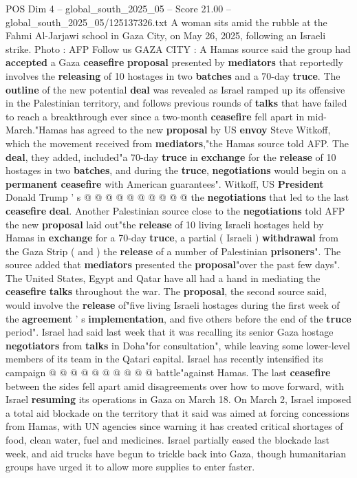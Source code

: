 \begin{textsample}{POS Dim 4 – global\_south\_2025\_05 – Score 21.00 – global\_south\_2025\_05/125137326.txt}  \label{ex:f4_pos_096}
A woman sits amid the rubble at the Fahmi Al-Jarjawi school in Gaza City, on May 26, 2025, following an Israeli strike.
Photo : AFP Follow us GAZA CITY : A Hamas source said the group had \textbf{accepted} a Gaza \textbf{ceasefire} \textbf{proposal} presented by \textbf{mediators} that reportedly involves the \textbf{releasing} of 10 hostages in two \textbf{batches} and a 70-day \textbf{truce}.
The \textbf{outline} of the new potential \textbf{deal} was revealed as Israel ramped up its offensive in the Palestinian territory, and follows previous rounds of \textbf{talks} that have failed to reach a breakthrough ever since a two-month \textbf{ceasefire} fell apart in mid-March."Hamas has agreed to the new \textbf{proposal} by US \textbf{envoy} Steve Witkoff, which the movement received from \textbf{mediators},"the Hamas source told AFP.
The \textbf{deal}, they added, included"a 70-day \textbf{truce} in \textbf{exchange} for the \textbf{release} of 10 hostages in two \textbf{batches}, and during the \textbf{truce}, \textbf{negotiations} would begin on a \textbf{permanent} \textbf{ceasefire} with American guarantees".
Witkoff, US \textbf{President} Donald Trump ' s @ @ @ @ @ @ @ @ @ @ the \textbf{negotiations} that led to the last \textbf{ceasefire} \textbf{deal}.
Another Palestinian source close to the \textbf{negotiations} told AFP the new \textbf{proposal} laid out"the \textbf{release} of 10 living Israeli hostages held by Hamas in \textbf{exchange} for a 70-day \textbf{truce}, a partial ( Israeli ) \textbf{withdrawal} from the Gaza Strip ( and ) the \textbf{release} of a number of Palestinian \textbf{prisoners}".
The source added that \textbf{mediators} presented the \textbf{proposal}"over the past few days".
The United States, Egypt and Qatar have all had a hand in mediating the \textbf{ceasefire} \textbf{talks} throughout the war.
The \textbf{proposal}, the second source said, would involve the \textbf{release} of"five living Israeli hostages during the first week of the \textbf{agreement} ' s \textbf{implementation}, and five others before the end of the \textbf{truce} period".
Israel had said last week that it was recalling its senior Gaza hostage \textbf{negotiators} from \textbf{talks} in Doha"for consultation", while leaving some lower-level members of its team in the Qatari capital.
Israel has recently intensified its campaign @ @ @ @ @ @ @ @ @ @ battle"against Hamas.
The last \textbf{ceasefire} between the sides fell apart amid disagreements over how to move forward, with Israel \textbf{resuming} its operations in Gaza on March 18.
On March 2, Israel imposed a total aid blockade on the territory that it said was aimed at forcing concessions from Hamas, with UN agencies since warning it has created critical shortages of food, clean water, fuel and medicines.
Israel partially eased the blockade last week, and aid trucks have begun to trickle back into Gaza, though humanitarian groups have urged it to allow more supplies to enter faster.

\end{textsample}
